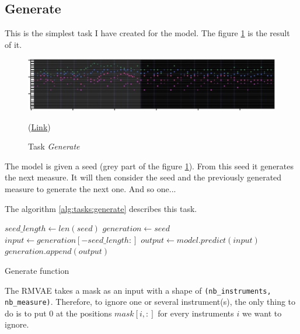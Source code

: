 \documentclass[12pt]{report}
\begin{document}
\subsection{Generate}
\label{sec:tasks:generate}

This is the simplest task I have created for the model.
The figure \ref{fig:tasks:generate} is the result of it.

\begin{figure}[htbp]
    \centering
    \includegraphics[width=\textwidth]{images/generated_midis/tasks/generate/generate.jpg}
    \caption{Task \textit{Generate}}
    (\href{https://github.com/ValentinVignal/midiGenerator/blob/master/samples/tasks/generate.mid}{Link})
    \label{fig:tasks:generate}
\end{figure}

The model is given a seed (grey part of the figure \ref{fig:tasks:generate}).
From this seed it generates the next measure.
It will then consider the seed and the previously generated measure to generate the next one.
And so one...

The algorithm \ref{alg:tasks:generate} describes this task.

\begin{algorithm}
    \begin{algorithmic}[1]
        \Statex
            \State $seed\_length \gets len(seed)$
            \State $generation \gets seed$
                \State $input \gets generation[-seed\_length:]$
                \State $output \gets model.predict(input)$
                \State $generation.append(output)$
            \EndFor
            \State {}
        \EndFunction
        \end{algorithmic}
    \caption{Generate function}
    \label{alg:tasks:generate}
\end{algorithm}

The RMVAE takes a mask as an input with a shape of \texttt{(nb\_instruments, nb\_measure)}.
Therefore, to ignore one or several instrument(s), the only thing to do is to put $0$ at the positions $mask[i, :]$ for every instruments $i$ we want to ignore.
\end{document}
